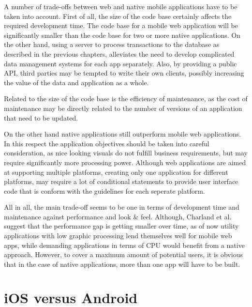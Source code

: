 A number of trade-offs between web and native mobile applications have to be taken into account. First of all, the size of the code base certainly affects the required development time. The code base for a mobile web application will be significantly smaller than the code base for two or more native applications\cite{Charland:2011:MAD:1941487.1941504}. On the other hand, using a server to process transactions to the database as described in the previous chapters, alleviates the need to develop complicated data management systems for each app separately. Also, by providing a public API, third parties may be tempted to write their own clients, possibly increasing the value of the data and application as a whole.

Related to the size of the code base is the efficiency of maintenance, as the cost of maintenance may be directly related to the number of versions of an application that need to be updated\cite{Charland:2011:MAD:1941487.1941504}.

On the other hand native applications still outperform mobile web applications. In this respect the application objectives should be taken into careful consideration, as nice looking visuals do not fulfill business requirements, but may require significantly more processing power. Although web applications are aimed at supporting multiple platforms, creating only one application for different platforms, may require a lot of conditional statements to provide user interface code that is conform with the guidelines for each seperate platform\cite{Charland:2011:MAD:1941487.1941504}.

All in all, the main trade-off seems to be one in terms of development time and maintenance against performance and look \& feel. Although, Charland et al. suggest that the performance gap is getting smaller over time, as of now utility applications with low graphic processing lend themselves well for mobile web apps, while demanding applications in terms of CPU would benefit from a native approach. However, to cover a maximum amount of potential users, it is obvious that in the case of native applications, more than one app will have to be built.


\section{iOS versus Android}



